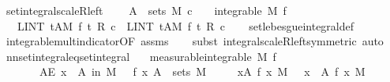 \begin{isabellebody}
{}
\isamarkuptrue%
%
\endisatagdocument
{\isafolddocument}%
%
\isadelimdocument
%
\endisadelimdocument
{}\isamarkupfalse%
\ set{\isacharunderscore}{\kern0pt}integral{\isacharunderscore}{\kern0pt}scaleR{\isacharunderscore}{\kern0pt}left{\isacharcolon}{\kern0pt}\ \isanewline
\ \ \ {\isachardoublequoteopen}A\ {\isasymin}\ sets\ M{\isachardoublequoteclose}\ {\isachardoublequoteopen}c\ {\isasymnoteq}\ {}\ {\isasymLongrightarrow}\ integrable\ M\ f{\isachardoublequoteclose}\isanewline
\ \ \ {\isachardoublequoteopen}LINT\ t{\isacharcolon}{\kern0pt}A{\isacharbar}{\kern0pt}M{\isachardot}{\kern0pt}\ f\ t\ {\isacharasterisk}{\kern0pt}\isactrlsub R\ c\ {\isacharequal}{\kern0pt}\ {\isacharparenleft}{\kern0pt}LINT\ t{\isacharcolon}{\kern0pt}A{\isacharbar}{\kern0pt}M{\isachardot}{\kern0pt}\ f\ t{\isacharparenright}{\kern0pt}\ {\isacharasterisk}{\kern0pt}\isactrlsub R\ c{\isachardoublequoteclose}\isanewline
%
\isadelimproof
\ \ %
\endisadelimproof
%
\isatagproof
{}\isamarkupfalse%
\ set{\isacharunderscore}{\kern0pt}lebesgue{\isacharunderscore}{\kern0pt}integral{\isacharunderscore}{\kern0pt}def\ \isanewline
\ \ \isamarkupfalse%
\ integrable{\isacharunderscore}{\kern0pt}mult{\isacharunderscore}{\kern0pt}indicator{\isacharbrackleft}{\kern0pt}OF\ assms{\isacharbrackright}{\kern0pt}\isanewline
\ \ \isamarkupfalse%
\ {\isacharparenleft}{\kern0pt}subst\ integral{\isacharunderscore}{\kern0pt}scaleR{\isacharunderscore}{\kern0pt}left{\isacharbrackleft}{\kern0pt}symmetric{\isacharbrackright}{\kern0pt}{\isacharcomma}{\kern0pt}\ auto{\isacharparenright}{\kern0pt}%
\endisatagproof
{\isafoldproof}%
%
\isadelimproof
\isanewline
%
\endisadelimproof
\isanewline
{}\isamarkupfalse%
\ nn{\isacharunderscore}{\kern0pt}set{\isacharunderscore}{\kern0pt}integral{\isacharunderscore}{\kern0pt}eq{\isacharunderscore}{\kern0pt}set{\isacharunderscore}{\kern0pt}integral{\isacharcolon}{\kern0pt}\isanewline
\ \ \ {\isacharbrackleft}{\kern0pt}measurable{\isacharbrackright}{\kern0pt}{\isacharcolon}{\kern0pt}{\isachardoublequoteopen}integrable\ M\ f{\isachardoublequoteclose}\isanewline
\ \ \ \ \ \ \ {\isachardoublequoteopen}AE\ x\ {\isasymin}\ A\ in\ M{\isachardot}{\kern0pt}\ {}\ {\isasymle}\ f\ x{\isachardoublequoteclose}\ {\isachardoublequoteopen}A\ {\isasymin}\ sets\ M{\isachardoublequoteclose}\isanewline
\ \ \ \ \ {\isachardoublequoteopen}{\isacharparenleft}{\kern0pt}{\isasymintegral}\isactrlsup {\isacharplus}{\kern0pt}x{\isasymin}A{\isachardot}{\kern0pt}\ f\ x\ {\isasympartial}M{\isacharparenright}{\kern0pt}\ {\isacharequal}{\kern0pt}\ {\isacharparenleft}{\kern0pt}{\isasymintegral}\ x\ {\isasymin}\ A{\isachardot}{\kern0pt}\ f\ x\ {\isasympartial}M{\isacharparenright}{\kern0pt}{\isachardoublequoteclose}\isanewline

\end{isabellebody}

